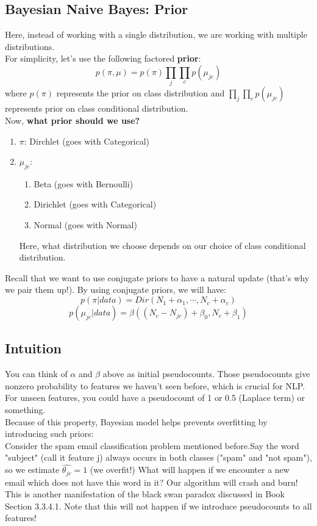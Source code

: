 \documentclass{article}
\begin{document}
\subsection{Bayesian Naive Bayes: Prior}
Here, instead of working with a single distribution, we are working with multiple distributions.\\
For simplicity, let's use the following factored \textbf{prior}: \\ 
\[p(\pi, \mu) = p(\pi) \prod_j \prod_c p(\mu_{jc})\] 
where $p(\pi)$ represents the prior on class distribution and $\prod_j \prod_c p(\mu_{jc})$ represents prior on class conditional distribution. \\
Now, \textbf{what prior should we use?}
\begin{enumerate}
    \item $\pi$: Dirchlet (goes with Categorical)
    \item $\mu_{jc}$: 
        \begin{enumerate}
            \item Beta (goes with Bernoulli)
            \item Dirichlet (goes with Categorical)
            \item Normal (goes with Normal)
        \end{enumerate}
        Here, what distribution we choose depends on our choice of class conditional distribution.
\end{enumerate} 
Recall that we want to use conjugate priors to have a natural update (that's why we pair them up!). By using conjugate priors, we will have: \\
    \[ p(\pi | data) = Dir(N_1 + \alpha_1, \cdots, N_c + \alpha_c) \]
    \[ p(\mu_{jc} | data) = \beta((N_c - N_{jc}) + \beta_0, N_c + \beta_1) \]
\subsection{Intuition}
You can think of $\alpha$ and $\beta$ above as initial pseudocounts. 
Those pseudocounts give nonzero probability to features we haven't seen before, which is crucial for NLP. For unseen features, you could have a pseudocount of 1 or 0.5 (Laplace term) or something.\\ 
Because of this property, Bayesian model helps prevents overfitting by introducing such priors:\\
Consider the spam email classification problem mentioned before.Say the word "subject" (call it feature j) always occurs in both classes ("spam" and "not spam"), so we estimate $\hat{\theta_{jc}} = 1$ (we overfit!) What will happen if we encounter a new email which does not have this word in it? Our algorithm will crash and burn! This is another manifestation of the black swan paradox discussed in Book Section 3.3.4.1. Note that this will not happen if we introduce pseudocounts to all features! 
\end{document}
